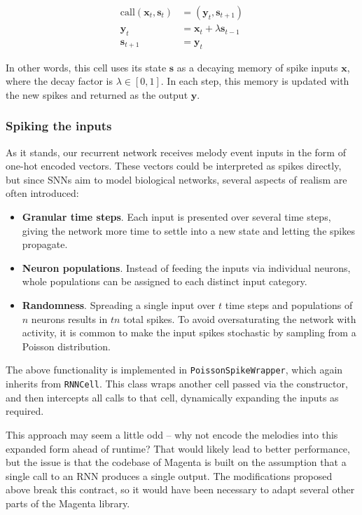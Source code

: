 \documentclass[../../report.tex]{subfiles}
\begin{document}
\begin{align*}
  \mathrm{call}(\bm{x}_t, \bm{s}_t) &= (\bm{y}_t, \bm{s}_{t+1}) \\
  \bm{y}_t &= \bm{x}_t + \lambda\bm{s}_{t-1} \\
  \bm{s}_{t+1} &= \bm{y}_t
\end{align*}

In other words, this cell uses its state \(\bm{s}\) as a decaying memory of
spike inputs \(\bm{x}\), where the decay factor is \(\lambda \in [0, 1]\). In
each step, this memory is updated with the new spikes and returned as the output
\(\bm{y}\).

\subsubsection{Spiking the inputs}
As it stands, our recurrent network receives melody event inputs in the form of
one-hot encoded vectors. These vectors could be interpreted as spikes directly,
but since SNNs aim to model biological networks, several aspects of realism are
often introduced:

\begin{itemize}
  \item \textbf{Granular time steps}. Each input is presented over several time
  steps, giving the network more time to settle into a new state and letting the
  spikes propagate.

  \item \textbf{Neuron populations}. Instead of feeding the inputs via
  individual neurons, whole populations can be assigned to each distinct input
  category.

  \item \textbf{Randomness}. Spreading a single input over \(t\) time steps and
  populations of \(n\) neurons results in \(tn\) total spikes. To avoid
  oversaturating the network with activity, it is common to make the input
  spikes stochastic by sampling from a Poisson distribution.
\end{itemize}

The above functionality is implemented in \texttt{PoissonSpikeWrapper}, which
again inherits from \texttt{RNNCell}. This class wraps another cell passed via
the constructor, and then intercepts all calls to that cell, dynamically
expanding the inputs as required.

This approach may seem a little odd -- why not encode the melodies into this
expanded form ahead of runtime? That would likely lead to better performance,
but the issue is that the codebase of Magenta is built on the assumption that a
single call to an RNN produces a single output. The modifications proposed above
break this contract, so it would have been necessary to adapt several other
parts of the Magenta library.
\end{document}

